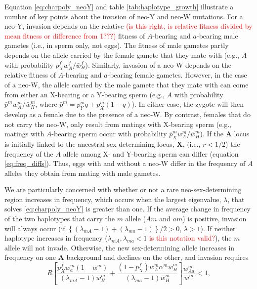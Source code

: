 \documentclass[12pt]{article}
\begin{document}
Equation \eqref{eq:charpoly_neoY} and table \ref{tab:haplotype_growth} illustrate a number of key points about the invasion of neo-Y and neo-W mutations. 
For a neo-Y, invasion depends on the relative \textcolor{red}{(is this right, is relative fitness divided by mean fitness or difference from 1???)} fitness of $A$-bearing and $a$-bearing male gametes (i.e., in sperm only, not eggs). 
The fitness of male gametes partly depends on the allele carried by the female gamete that they mate with (e.g., $A$ with probability $p_{X}^{f} w_{A}^{f}/\bar{w}_{H}^{f}$).
Similarly, invasion of a neo-W depends on the relative fitness of $A$-bearing and $a$-bearing female gametes. 
However, in the case of a neo-W, the allele carried by the male gamete that they mate with can come from either an X-bearing or a Y-bearing sperm (e.g., $A$ with probability $\bar{p}^{m} w_{A}^{m}/\bar{w}_{H}^{m}$, where $\bar{p}^{m}=p_{Y}^{m}q+p_{X}^{m}(1-q)$). In either case, the zygote will then develop as a female due to the presence of a neo-W. 
By contrast, females that do not carry the neo-W, only result from matings with X-bearing sperm (e.g., matings with $A$-bearing sperm occur with probability $\bar{p}_{X}^{m} w_{A}^{m}/\bar{w}_{H}^{m}$). 
If the \textbf{A} locus is initially linked to the ancestral sex-determining locus, \textbf{X}, (i.e., $r<1/2$) the frequency of the $A$ allele among X- and Y-bearing sperm can differ (equation \ref{eq:freq_diffs}). 
Thus, eggs with and without a neo-W differ in the frequency of $A$ alleles they obtain from mating with male gametes. 

We are particularly concerned with whether or not a rare neo-sex-determining region increases in frequency, which occurs when the largest eigenvalue, $\lambda$, that solves \eqref{eq:charpoly_neoY} is greater than one. 
If the average change in frequency of the two haplotypes that carry the $m$ allele ($Am$ and $am$) is positive, invasion will always occur (if $\left\{(\lambda_{mA}-1)+ (\lambda_{ma}-1) \right\}/2>0$, $\lambda>1$). 
If neither haplotype increases in frequency ($\lambda_{mA}, \lambda_{ma} < 1$ \textcolor{red}{is this notation valid?}), the $m$ allele will not invade. 
Otherwise, the new sex-determining allele increases in frequency on one \textbf{A} background and declines on the other, and invasion requires
\begin{equation}\label{eq:neoYR}
R \left[ 
\frac{p^f_X w^m_a (1-\alpha^m)}{(\lambda_{mA}-1)\bar{w}_{H}^{m}} + 
\frac{(1 - p^f_X) w^m_A \alpha^m \bar{w}_{H}^{m}}{(\lambda_{ma}-1)\bar{w}_{H}^{m}} \right] 
\frac{w^m_{Aa}}{\bar{w}^m} < 1,
\end{equation}
\end{document}

